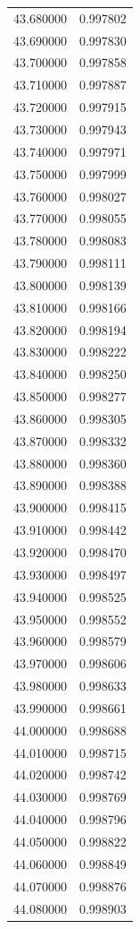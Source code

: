 \begin{tabular}{rr}
43.680000 & 0.997802 \\
43.690000 & 0.997830 \\
43.700000 & 0.997858 \\
43.710000 & 0.997887 \\
43.720000 & 0.997915 \\
43.730000 & 0.997943 \\
43.740000 & 0.997971 \\
43.750000 & 0.997999 \\
43.760000 & 0.998027 \\
43.770000 & 0.998055 \\
43.780000 & 0.998083 \\
43.790000 & 0.998111 \\
43.800000 & 0.998139 \\
43.810000 & 0.998166 \\
43.820000 & 0.998194 \\
43.830000 & 0.998222 \\
43.840000 & 0.998250 \\
43.850000 & 0.998277 \\
43.860000 & 0.998305 \\
43.870000 & 0.998332 \\
43.880000 & 0.998360 \\
43.890000 & 0.998388 \\
43.900000 & 0.998415 \\
43.910000 & 0.998442 \\
43.920000 & 0.998470 \\
43.930000 & 0.998497 \\
43.940000 & 0.998525 \\
43.950000 & 0.998552 \\
43.960000 & 0.998579 \\
43.970000 & 0.998606 \\
43.980000 & 0.998633 \\
43.990000 & 0.998661 \\
44.000000 & 0.998688 \\
44.010000 & 0.998715 \\
44.020000 & 0.998742 \\
44.030000 & 0.998769 \\
44.040000 & 0.998796 \\
44.050000 & 0.998822 \\
44.060000 & 0.998849 \\
44.070000 & 0.998876 \\
44.080000 & 0.998903 \\

\end{tabular}

